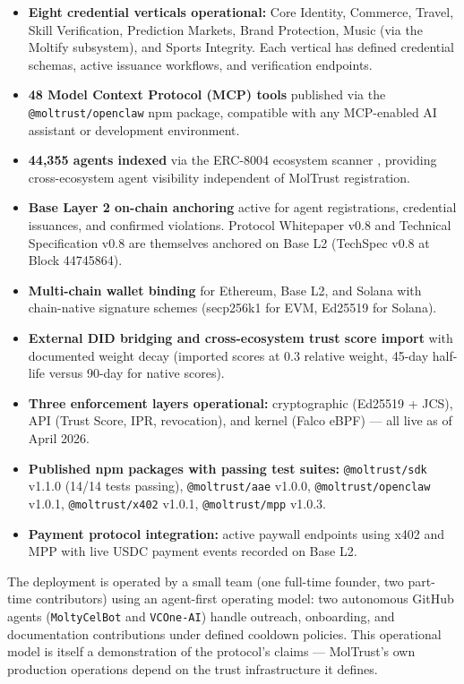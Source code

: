\begin{itemize}
\item \textbf{Eight credential verticals operational:} Core Identity, Commerce, Travel, Skill Verification, Prediction Markets, Brand Protection, Music (via the Moltify subsystem), and Sports Integrity. Each vertical has defined credential schemas, active issuance workflows, and verification endpoints.
\item \textbf{48 Model Context Protocol (MCP) tools} published via the \texttt{@moltrust/openclaw} npm package, compatible with any MCP-enabled AI assistant or development environment.
\item \textbf{44,355 agents indexed} via the ERC-8004 ecosystem scanner \cite{ref37_erc8004}, providing cross-ecosystem agent visibility independent of MolTrust registration.
\item \textbf{Base Layer 2 on-chain anchoring} active for agent registrations, credential issuances, and confirmed violations. Protocol Whitepaper v0.8 and Technical Specification v0.8 are themselves anchored on Base L2 (TechSpec v0.8 at Block 44745864).
\item \textbf{Multi-chain wallet binding} for Ethereum, Base L2, and Solana with chain-native signature schemes (secp256k1 for EVM, Ed25519 for Solana).
\item \textbf{External DID bridging and cross-ecosystem trust score import} with documented weight decay (imported scores at 0.3 relative weight, 45-day half-life versus 90-day for native scores).
\item \textbf{Three enforcement layers operational:} cryptographic (Ed25519 + JCS), API (Trust Score, IPR, revocation), and kernel (Falco eBPF) — all live as of April 2026.
\item \textbf{Published npm packages with passing test suites:} \texttt{@moltrust/sdk} v1.1.0 (14/14 tests passing), \texttt{@moltrust/aae} v1.0.0, \texttt{@moltrust/openclaw} v1.0.1, \texttt{@moltrust/x402} v1.0.1, \texttt{@moltrust/mpp} v1.0.3.
\item \textbf{Payment protocol integration:} active paywall endpoints using x402 and MPP with live USDC payment events recorded on Base L2.
\end{itemize}

The deployment is operated by a small team (one full-time founder, two part-time contributors) using an agent-first operating model: two autonomous GitHub agents (\texttt{MoltyCelBot} and \texttt{VCOne-AI}) handle outreach, onboarding, and documentation contributions under defined cooldown policies. This operational model is itself a demonstration of the protocol's claims — MolTrust's own production operations depend on the trust infrastructure it defines.


